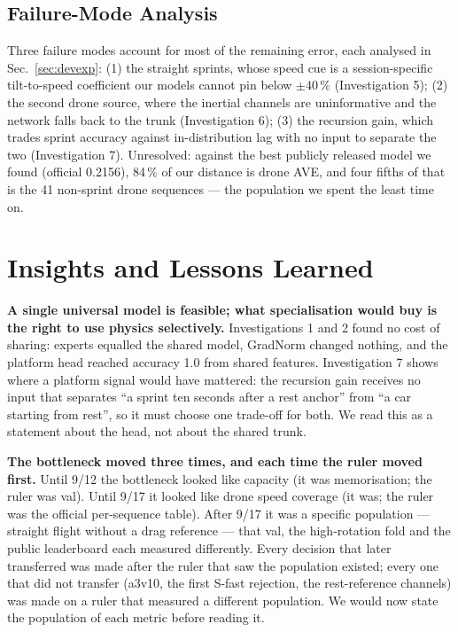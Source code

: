 \documentclass[letterpaper,10pt,conference]{ieeeconf}
\begin{document}
\subsection{Failure-Mode Analysis}
Three failure modes account for most of the remaining error, each analysed in
Sec.~\ref{sec:devexp}: (1) the straight sprints, whose speed cue is a session-specific
tilt-to-speed coefficient our models cannot pin below $\pm40\,\%$ (Investigation 5); (2) the
second drone source, where the inertial channels are uninformative and the network falls back to
the trunk (Investigation 6); (3) the recursion gain, which trades sprint accuracy against
in-distribution lag with no input to separate the two (Investigation 7). Unresolved: against the
best publicly released model we found (official 0.2156), 84\,\% of our distance is drone AVE, and
four fifths of that is the 41 non-sprint drone sequences --- the population we spent the least
time on.

\section{Insights and Lessons Learned}
\label{sec:insights}

\textbf{A single universal model is feasible; what specialisation would buy is the right to use
physics selectively.} Investigations 1 and 2 found no cost of sharing: experts equalled the shared
model, GradNorm changed nothing, and the platform head reached accuracy 1.0 from shared
features. Investigation 7 shows where a platform signal would have mattered: the recursion gain
receives no input that separates ``a sprint ten seconds after a rest anchor'' from ``a car
starting from rest'', so it must choose one trade-off for both. We read this as a statement
about the head, not about the shared trunk.

\textbf{The bottleneck moved three times, and each time the ruler moved first.} Until 9/12 the
bottleneck looked like capacity (it was memorisation; the ruler was val). Until 9/17 it looked
like drone speed coverage (it was; the ruler was the official per-sequence table). After 9/17 it
was a specific population --- straight flight without a drag reference --- that val, the
high-rotation fold and the public leaderboard each measured differently. Every decision that later
transferred was made after the ruler that saw the population existed; every one that did not
transfer (a3v10, the first S-fast rejection, the rest-reference channels) was made on a ruler that
measured a different population. We would now state the population of each metric before
reading it.
\end{document}
